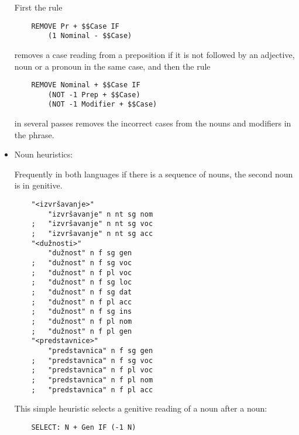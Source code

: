 \begin{itemize}
First the rule

{\small
\begin{Verbatim}
    REMOVE Pr + $$Case IF 
        (1 Nominal - $$Case)
\end{Verbatim}
}

removes a case reading from a preposition if it is not followed by an
adjective, noun or a pronoun in the same case, and then the rule

{\small
\begin{Verbatim}
    REMOVE Nominal + $$Case IF
        (NOT -1 Prep + $$Case) 
        (NOT -1 Modifier + $$Case)
\end{Verbatim}
}

in several passes removes the incorrect cases from the nouns and
modifiers in the phrase.

\item Noun heuristics:


Frequently in both languages if there is a sequence of nouns, the
second noun is in genitive.

{\small
\begin{Verbatim}
    "<izvršavanje>"
        "izvršavanje" n nt sg nom 
    ;   "izvršavanje" n nt sg voc
    ;   "izvršavanje" n nt sg acc
    "<dužnosti>"
        "dužnost" n f sg gen
    ;   "dužnost" n f sg voc
    ;   "dužnost" n f pl voc
    ;   "dužnost" n f sg loc
    ;   "dužnost" n f sg dat
    ;   "dužnost" n f pl acc
    ;   "dužnost" n f sg ins
    ;   "dužnost" n f pl nom
    ;   "dužnost" n f pl gen
    "<predstavnice>"
        "predstavnica" n f sg gen
    ;   "predstavnica" n f sg voc
    ;   "predstavnica" n f pl voc
    ;   "predstavnica" n f pl nom
    ;   "predstavnica" n f pl acc
\end{Verbatim}
}

This simple heuristic selects a genitive reading of a noun after a noun:

{\small
\begin{Verbatim}
    SELECT: N + Gen IF (-1 N)
\end{Verbatim}
}
\end{itemize}

